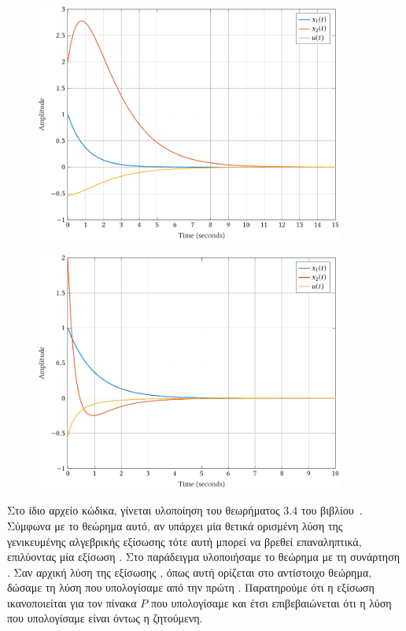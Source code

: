 \begin{figure}[h]
    \centering
    \includegraphics[width=0.9\textwidth]{figures/gcc_linear_bound2.pdf}
    \label{fig:gcc_linear_bound2}
\end{figure}
\begin{figure}[h]
    \centering
    \includegraphics[width=0.9\textwidth]{figures/gcc_linear_bound3.pdf}
    \label{fig:gcc_linear_bound3}
\end{figure}

Στο ίδιο αρχείο κώδικα, γίνεται υλοποίηση του θεωρήματος \( 3.4 \) του
βιβλίου~\cite{kosmidou2009robust}. Σύμφωνα με το θεώρημα αυτό, αν υπάρχει μία
θετικά ορισμένη λύση της γενικευμένης αλγεβρικής εξίσωσης  τότε αυτή
μπορεί να βρεθεί επαναληπτικά, επιλύοντας μία εξίσωση . Στο
παράδειγμα υλοποιήσαμε το θεώρημα με τη συνάρτηση . Σαν
αρχική λύση της εξίσωσης , όπως αυτή ορίζεται στο αντίστοιχο
θεώρημα, δώσαμε τη λύση που υπολογίσαμε από την πρώτη .
Παρατηρούμε ότι η εξίσωση  ικανοποιείται για τον πίνακα \( P \)
που υπολογίσαμε και έτσι επιβεβαιώνεται ότι η λύση που υπολογίσαμε είναι όντως η
ζητούμενη.

